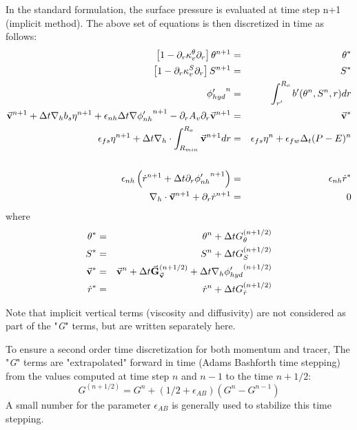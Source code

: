 In the standard formulation, the surface pressure is 
evaluated at time step n+1 (implicit method).
The above set of equations is then discretized in time 
as follows:
\begin{eqnarray}
\left[ 1 - \partial_r \kappa_v^\theta \partial_r \right]
\theta^{n+1} & = & \theta^*
\label{eq-tDsC-theta}
\\
\left[ 1 - \partial_r \kappa_v^S \partial_r \right]
S^{n+1} & = & S^*
\label{eq-tDsC-salt}
\\
{\phi'_{hyd}}^{n} & = & \int_{r'}^{R_o} b'(\theta^{n},S^{n},r) dr
\label{eq-tDsC-hyd}
\\
\vec{\bf v} ^{n+1}
+ \Delta t {\bf \nabla}_h b_s {\eta}^{n+1}
+ \epsilon_{nh} \Delta t {\bf \nabla} {\phi'_{nh}}^{n+1}
- \partial_r A_v \partial_r \vec{\bf v}^{n+1}
& = &
\vec{\bf v}^*
\label{eq-tDsC-Hmom}
\\
\epsilon_{fs} {\eta}^{n+1} + \Delta t
{\bf \nabla}_h \cdot \int_{R_{min}}^{R_o} \vec{\bf v}^{n+1} dr
& = & 
    \epsilon_{fs} {\eta}^{n} + \epsilon_{fw} \Delta_t (P-E)^{n} 
\nonumber
\\
\label{eq-tDsC-eta}
\\
\epsilon_{nh} \left( \dot{r} ^{n+1}
+ \Delta t \partial_r {\phi'_{nh}} ^{n+1}
\right)
& = & \epsilon_{nh} \dot{r}^*
\label{eq-tDsC-Vmom}
\\
{\bf \nabla}_h \cdot \vec{\bf v}^{n+1} + \partial_r \dot{r}^{n+1}
& = & 0
\label{eq-tDsC-cont}
\end{eqnarray}
where
\begin{eqnarray}
\theta^* & = &
\theta ^{n} + \Delta t G_{\theta} ^{(n+1/2)}
\\
S^* & = &
S ^{n} + \Delta t G_{S} ^{(n+1/2)}
\\
\vec{\bf v}^* & = &
\vec{\bf v}^{n} + \Delta t \vec{\bf G}_{\vec{\bf v}} ^{(n+1/2)}
+ \Delta t  {\bf \nabla}_h {\phi'_{hyd}}^{(n+1/2)}
\\
\dot{r}^* & = &
\dot{r} ^{n} + \Delta t G_{\dot{r}} ^{(n+1/2)}
\end{eqnarray}

Note that implicit vertical terms (viscosity and diffusivity) are 
not considered as part of the "{\it G}" terms, but are 
written separately here.

To ensure a second order time discretization for both 
momentum and tracer,
The "{\it G}" terms are "extrapolated" forward in time
(Adams Bashforth time stepping)
from the values computed at time step $n$ and $n-1$
to the time $n+1/2$:
$$G^{(n+1/2)} = G^n + (1/2+\epsilon_{AB}) (G^n - G^{n-1})$$
A small number for the parameter $\epsilon_{AB}$ is generally used 
to stabilize this time stepping.

